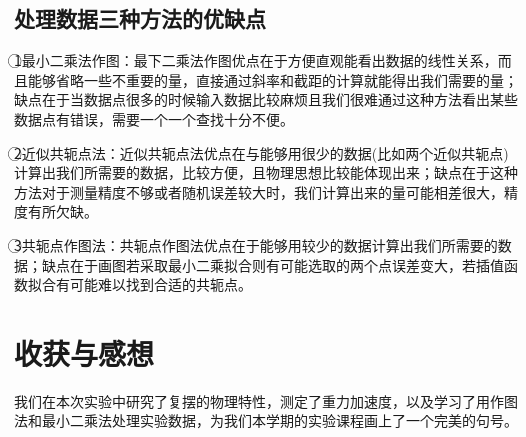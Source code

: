 \documentclass[a4 paper,12pt]{article}
\begin{document}
\subsection{处理数据三种方法的优缺点}
\textcircled{1}最小二乘法作图：最下二乘法作图优点在于方便直观能看出数据的线性关系，而且能够省略一些不重要的量，直接通过斜率和截距的计算就能得出我们需要的量；缺点在于当数据点很多的时候输入数据比较麻烦且我们很难通过这种方法看出某些数据点有错误，需要一个一个查找十分不便。\\
\par \textcircled{2}近似共轭点法：近似共轭点法优点在与能够用很少的数据(比如两个近似共轭点)计算出我们所需要的数据，比较方便，且物理思想比较能体现出来；缺点在于这种方法对于测量精度不够或者随机误差较大时，我们计算出来的量可能相差很大，精度有所欠缺。\\
\par \textcircled{3}共轭点作图法：共轭点作图法优点在于能够用较少的数据计算出我们所需要的数据；缺点在于画图若采取最小二乘拟合则有可能选取的两个点误差变大，若插值函数拟合有可能难以找到合适的共轭点。
\section{收获与感想}
我们在本次实验中研究了复摆的物理特性，测定了重力加速度，以及学习了用作图法和最小二乘法处理实验数据，为我们本学期的实验课程画上了一个完美的句号。
\end{document}
